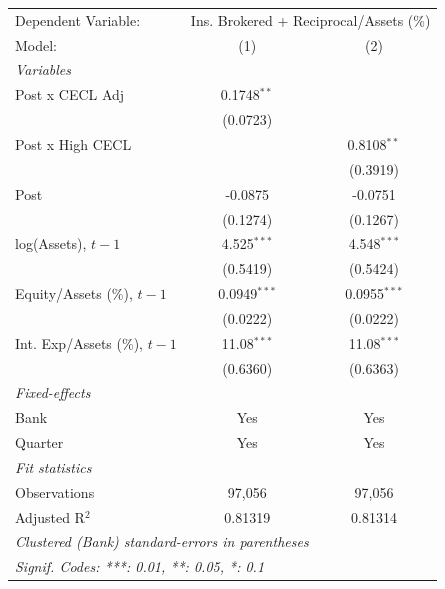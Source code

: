 
\begingroup
\centering
\begin{tabular}{lcc}
   \tabularnewline \midrule \midrule
   Dependent Variable: & \multicolumn{2}{c}{Ins. Brokered + Reciprocal/Assets (\%)}\\
   Model:                         & (1)            & (2)\\  
   \midrule
   \emph{Variables}\\
   Post x CECL Adj                & 0.1748$^{**}$  &   \\   
                                  & (0.0723)       &   \\   
   Post x High CECL               &                & 0.8108$^{**}$\\   
                                  &                & (0.3919)\\   
   Post                           & -0.0875        & -0.0751\\   
                                  & (0.1274)       & (0.1267)\\   
   log(Assets), $t{-}1$           & 4.525$^{***}$  & 4.548$^{***}$\\   
                                  & (0.5419)       & (0.5424)\\   
   Equity/Assets (\%), $t{-}1$    & 0.0949$^{***}$ & 0.0955$^{***}$\\   
                                  & (0.0222)       & (0.0222)\\   
   Int. Exp/Assets (\%), $t{-}1$  & 11.08$^{***}$  & 11.08$^{***}$\\   
                                  & (0.6360)       & (0.6363)\\   
   \midrule
   \emph{Fixed-effects}\\
   Bank                           & Yes            & Yes\\  
   Quarter                        & Yes            & Yes\\  
   \midrule
   \emph{Fit statistics}\\
   Observations                   & 97,056         & 97,056\\  
   Adjusted R$^2$                 & 0.81319        & 0.81314\\  
   \midrule \midrule
   \multicolumn{3}{l}{\emph{Clustered (Bank) standard-errors in parentheses}}\\
   \multicolumn{3}{l}{\emph{Signif. Codes: ***: 0.01, **: 0.05, *: 0.1}}\\
\end{tabular}
\par\endgroup


